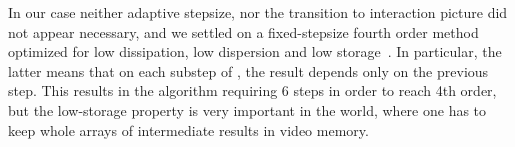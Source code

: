 In our case neither adaptive stepsize, nor the transition to interaction picture did not appear necessary, and we settled on a fixed-stepsize fourth order  method optimized for low dissipation, low dispersion and low storage~\cite{Berland2006}.
In particular, the latter means that on each substep of , the result depends only on the previous step.
This results in the algorithm requiring 6 steps in order to reach 4th order, but the low-storage property is very important in the  world, where one has to keep whole arrays of intermediate results in video memory.
